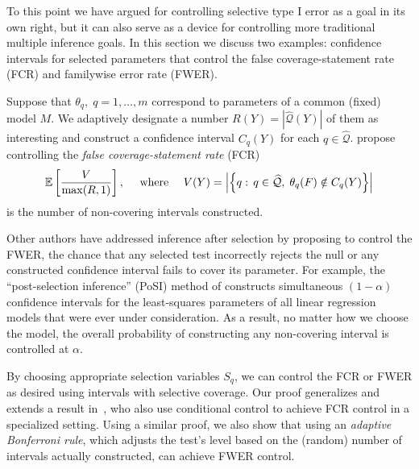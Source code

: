 \documentclass{article}
\theoremstyle{definition}
\newcommand{\hcQ}{\widehat{\mathcal{Q}}}
\begin{document}
To this point we have argued for controlling selective type I error as a goal in its own right, but it can also serve as a device for controlling more traditional multiple inference goals. In this section we discuss two examples: confidence intervals for selected parameters that control the false coverage-statement rate (FCR) and familywise error rate (FWER).

Suppose that $\theta_q,\;q=1,\ldots,m$ correspond to parameters of a common (fixed) model $M$. We adaptively designate a number $R(Y)=|\hcQ(Y)|$ of them as interesting and construct a confidence interval $C_q(Y)$ for each $q\in \hcQ$. \citet{benjamini2005false} propose controlling the {\em false coverage-statement rate} (FCR)
\begin{equation}\label{eq:fcrV}
  \E\left[\frac{V}{\max(R,1)}\right],\quad \text{ where }\quad
  V(Y) = \left|\left\{q:\, q\in\hcQ, \;\theta_q(F) \notin C_q(Y)\right\}\right|
\end{equation}
is the number of non-covering intervals constructed. 

Other authors have addressed inference after selection by proposing to control the FWER, the chance that any selected test incorrectly rejects the null or any constructed confidence interval fails to cover its parameter. For example, the ``post-selection inference'' (PoSI) method of \citet{berk2013valid} constructs simultaneous $(1-\alpha)$ confidence intervals for the least-squares parameters of all linear regression models that were ever under consideration. As a result, no matter how we choose the model, the overall probability of constructing any non-covering interval is controlled at $\alpha$.

By choosing appropriate selection variables $S_q$, we can control the FCR or FWER as desired using intervals with selective coverage. Our proof generalizes and extends a result in~\citet{weinstein2013selection}, who also use conditional control to achieve FCR control in a specialized setting. Using a similar proof, we also show that using an {\em adaptive Bonferroni rule}, which adjusts the test's level based on the (random) number of intervals actually constructed, can achieve FWER control.
\end{document}
